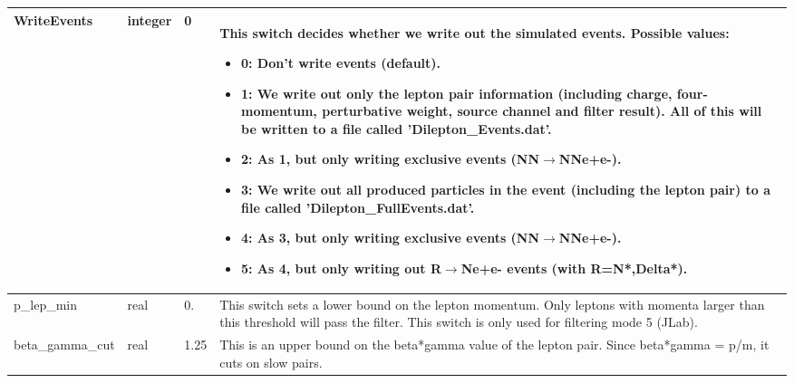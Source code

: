 \documentclass{article}
\begin{document}
\begin{longtable}{llll}
WriteEvents & \begin{minipage}[t]{2cm}integer\end{minipage} & \begin{minipage}[t]{2cm}0\end{minipage} & \begin{minipage}[t]{12cm}This switch decides whether we write out the simulated events. Possible values:\begin{itemize}\leftmargin0em\itemindent0pt\item 0: Don't write events (default).\item 1: We write out only the lepton pair information (including charge,   four-momentum, perturbative weight, source channel and filter result).   All of this will be written to a file called 'Dilepton\_Events.dat'.\item 2: As 1, but only writing exclusive events (NN$\rightarrow$NNe+e-).\item 3: We write out all produced particles in the event   (including the lepton pair) to a file called 'Dilepton\_FullEvents.dat'.\item 4: As 3, but only writing exclusive events (NN$\rightarrow$NNe+e-).\item 5: As 4, but only writing out R$\rightarrow$Ne+e- events (with R=N*,Delta*).\end{itemize}\end{minipage}\\*
\midrule
p\_lep\_min & \begin{minipage}[t]{2cm}real\end{minipage} & \begin{minipage}[t]{2cm}0.\end{minipage} & \begin{minipage}[t]{12cm}This switch sets a lower bound on the lepton momentum. Only leptons with momenta larger than this threshold will pass the filter. This switch is only used for filtering mode 5 (JLab).\end{minipage}\\*
\midrule
beta\_gamma\_cut & \begin{minipage}[t]{2cm}real\end{minipage} & \begin{minipage}[t]{2cm}1.25\end{minipage} & \begin{minipage}[t]{12cm}This is an upper bound on the beta*gamma value of the lepton pair. Since beta*gamma = p/m, it cuts on slow pairs.\end{minipage}\\*

\end{longtable}
\end{document}
